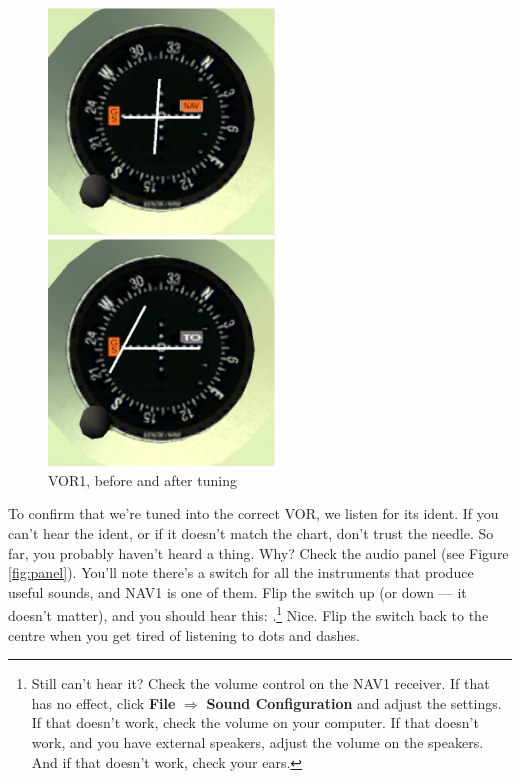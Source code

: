 \begin{figure}
  \begin{minipage}[b]{0.5\linewidth}
    \includegraphics[width=6cm]{img/VOR1_before}
  \end{minipage}
  \hspace{0.5cm}
  \begin{minipage}[b]{0.5\linewidth}
    \includegraphics[width=6cm]{img/VOR1_after}
  \end{minipage}
  \caption{VOR1, before and after tuning}
  \label{fig:VOR1}
\end{figure}

To confirm that we're tuned into the correct VOR, we listen for its
ident.  If you can't hear the ident, or if it doesn't match the chart,
don't trust the needle.  So far, you probably haven't heard a thing.
Why?  Check the audio panel (see Figure \ref{fig:panel}).  You'll note
there's a switch for all the instruments that produce useful sounds,
and NAV1 is one of them.  Flip the switch up (or down --- it doesn't
matter), and you should hear this: \mdot\mdot\mdot\mspace
\mdot\mdash\mdash\mdash\mspace \mdash\mdot\mdash\mdot.\footnote{Still
  can't hear it?  Check the volume control on the NAV1 receiver.  If
  that has no effect, click \textbf{\textsf{File}} $\Rightarrow$
  \textbf{\textsf{Sound Configuration}} and adjust the settings.  If
  that doesn't work, check the volume on your computer.  If that
  doesn't work, and you have external speakers, adjust the volume on
  the speakers.  And if that doesn't work, check your ears.} Nice.
Flip the switch back to the centre when you get tired of listening to
dots and dashes.

